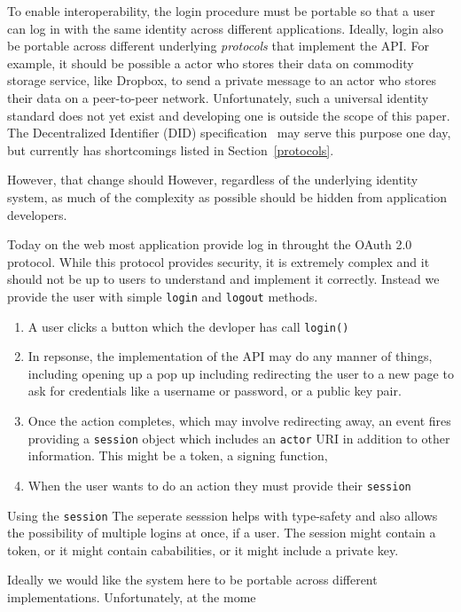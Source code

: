 To enable interoperability, the login procedure must be portable
so that a user can log in with the
same identity across different applications.
Ideally, login also be portable across different underlying
\emph{protocols} that implement the API.
For example, it should be possible a actor who stores their data on
commodity storage service, like Dropbox, to send a private message
to an actor who stores their data on a peer-to-peer network.
Unfortunately, such a universal identity standard does not yet exist
and developing one is outside the scope of this paper.
The Decentralized Identifier (DID) specification~\cite{dids} may serve this purpose one day,
but currently has shortcomings listed in Section~\ref{protocols}.

However, that change should
However, regardless of the underlying identity system,
as much of the complexity as possible should be hidden from
application developers.

Today on the web most application provide log in throught the OAuth 2.0
protocol. While this protocol provides security, it is extremely complex
and it should not be up to users to understand and implement it correctly.
Instead we provide the user with simple \texttt{login} and \texttt{logout} methods.

\begin{enumerate}
\item
A user clicks a button which the devloper has call \texttt{login()}
\item
In repsonse, the implementation of the API may do any manner of things,
including opening up a pop up including redirecting the user to a new page
to ask for credentials like a username or password, or a public key pair.
\item
Once the action completes, which may involve redirecting away, an event fires
providing a \texttt{session} object which includes an \texttt{actor} URI
in addition to other information. This might be a token, a signing function,
\item
When the user wants to do an action they must provide their \texttt{session}
\end{enumerate}

Using the \texttt{session}
The seperate sesssion helps with type-safety and also allows the possibility of multiple logins
at once, if a user.
The session might contain a token, or it might contain cababilities, or it might include a private key.

Ideally we would like the system here to be portable across different implementations.
Unfortunately, at the mome

